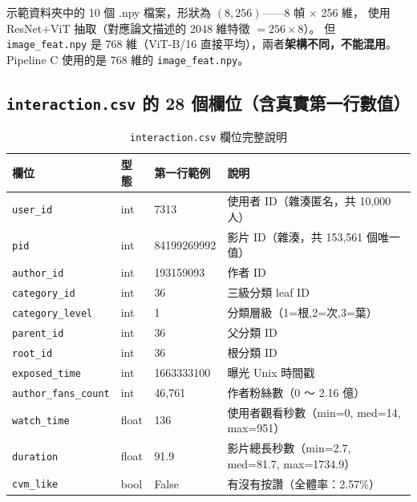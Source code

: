 \documentclass[12pt, a4paper]{article}
\begin{document}
\begin{warnbox2}
示範資料夾中的 10 個 .npy 檔案，形狀為 $(8, 256)$——8 幀 $\times$ 256 維，
使用 ResNet+ViT 抽取（對應論文描述的 2048 維特徵 $= 256 \times 8$）。
但 \texttt{image\_feat.npy} 是 768 維（ViT-B/16 直接平均），兩者\textbf{架構不同，不能混用}。
Pipeline C 使用的是 768 維的 \texttt{image\_feat.npy}。
\end{warnbox2}

\subsection{\texttt{interaction.csv} 的 28 個欄位（含真實第一行數值）}

\begin{table}[H]
\centering
\caption{\texttt{interaction.csv} 欄位完整說明}
\label{tab:inter_fields}
\footnotesize
\begin{tabular}{lll>{\raggedright\arraybackslash}p{5cm}}
\toprule
\textbf{欄位} & \textbf{型態} & \textbf{第一行範例} & \textbf{說明} \\
\midrule
\texttt{user\_id}           & int   & 7313          & 使用者 ID（雜湊匿名，共 10,000 人） \\
\texttt{pid}                & int   & 84199269992   & 影片 ID（雜湊，共 153,561 個唯一值） \\
\texttt{author\_id}         & int   & 193159093     & 作者 ID \\
\texttt{category\_id}       & int   & 36            & 三級分類 leaf ID \\
\texttt{category\_level}    & int   & 1             & 分類層級（1=根,2=次,3=葉） \\
\texttt{parent\_id}         & int   & 36            & 父分類 ID \\
\texttt{root\_id}           & int   & 36            & 根分類 ID \\
\texttt{exposed\_time}      & int   & 1663333100    & 曝光 Unix 時間戳 \\
\texttt{author\_fans\_count}& int   & 46,761        & 作者粉絲數（0 ～ 2.16 億） \\
\texttt{watch\_time}        & float & 136           & 使用者觀看秒數（min=0, med=14, max=951） \\
\texttt{duration}           & float & 91.9          & 影片總長秒數（min=2.7, med=81.7, max=1734.9） \\
\texttt{cvm\_like}          & bool  & False         & 有沒有按讚（全體率：2.57\%） \\

\end{tabular}
\end{table}
\end{document}
